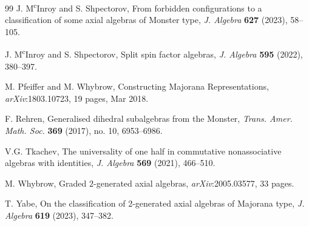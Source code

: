 \documentclass[11pt, a4paper]{article}
\theoremstyle{plain}
\theoremstyle{definition}
\newcommand{\0}{\overline{0}}
\newcommand{\2}{\overline{2}}
\newcommand{\1}{\mathbbm{1}}
\begin{document}
\begin{thebibliography}{99}
 J. M\textsuperscript{c}Inroy and S. Shpectorov, From forbidden configurations to a classification of some axial algebras of Monster type, \textit{J. Algebra} {\bf 627} (2023), 58--105.

 J. M\textsuperscript{c}Inroy and S. Shpectorov, Split spin factor algebras, \textit{J. Algebra} {\bf 595} (2022), 380--397.

 M. Pfeiffer and M. Whybrow, Constructing Majorana Representations, \textit{arXiv}:1803.10723, 19 pages, Mar 2018.

 F. Rehren, Generalised dihedral subalgebras from the Monster, \textit{Trans. Amer. Math. Soc.} {\bf 369} (2017), no. 10, 6953--6986.


 V.G. Tkachev, The universality of one half in commutative nonassociative algebras with identities, \textit{J. Algebra} {\bf 569} (2021), 466--510.

 M. Whybrow,  Graded $2$-generated axial algebras, \textit{arXiv}:2005.03577, 33 pages.

 T. Yabe, On the classification of 2-generated axial algebras of Majorana type, \textit{J. Algebra} {\bf 619} (2023), 347--382.
\end{thebibliography}
\end{document}
